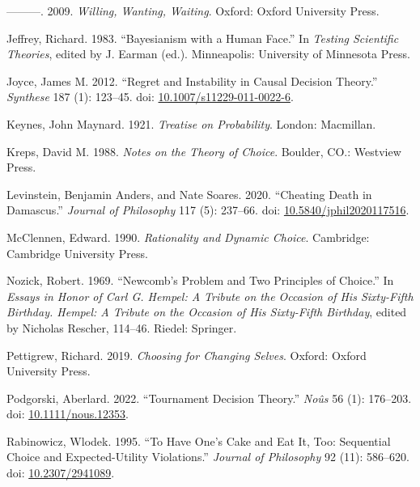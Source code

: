 \documentclass[
  10pt,
  letterpaper,
  DIV=11,
  numbers=noendperiod,
  twoside]{scrartcl}
\newlength{\cslhangindent}
\newenvironment{CSLReferences}[2] %
 {\begin{list}{}{%
  \setlength{\itemindent}{0pt}
  \setlength{\leftmargin}{0pt}
  \setlength{\parsep}{0pt}
  \ifodd #1
   \setlength{\leftmargin}{\cslhangindent}
   \setlength{\itemindent}{-1\cslhangindent}
  \fi
  \setlength{\itemsep}{#2\baselineskip}}}
 {\end{list}}
\begin{document}
\begin{CSLReferences}{1}{0}
---------. 2009. \emph{Willing, Wanting, Waiting}. Oxford: Oxford
University Press.

Jeffrey, Richard. 1983. {``Bayesianism with a Human Face.''} In
\emph{Testing Scientific Theories}, edited by J. Earman (ed.).
Minneapolis: University of Minnesota Press.

Joyce, James M. 2012. {``Regret and Instability in Causal Decision
Theory.''} \emph{Synthese} 187 (1): 123--45. doi:
\href{https://doi.org/10.1007/s11229-011-0022-6}{10.1007/s11229-011-0022-6}.

Keynes, John Maynard. 1921. \emph{Treatise on Probability}. London:
Macmillan.

Kreps, David M. 1988. \emph{Notes on the Theory of Choice}. Boulder,
CO.: Westview Press.

Levinstein, Benjamin Anders, and Nate Soares. 2020. {``Cheating Death in
Damascus.''} \emph{Journal of Philosophy} 117 (5): 237--66. doi:
\href{https://doi.org/10.5840/jphil2020117516}{10.5840/jphil2020117516}.

McClennen, Edward. 1990. \emph{Rationality and Dynamic Choice}.
Cambridge: {C}ambridge {U}niversity {P}ress.

Nozick, Robert. 1969. {``Newcomb's Problem and Two Principles of
Choice.''} In \emph{Essays in Honor of Carl {G}. Hempel: A Tribute on
the Occasion of His Sixty-Fifth Birthday. Hempel: A Tribute on the
Occasion of His Sixty-Fifth Birthday}, edited by Nicholas Rescher,
114--46. Riedel: Springer.

Pettigrew, Richard. 2019. \emph{Choosing for Changing Selves}. Oxford:
{O}xford {U}niversity {P}ress.

Podgorski, Aberlard. 2022. {``Tournament Decision Theory.''}
\emph{No{û}s} 56 (1): 176--203. doi:
\href{https://doi.org/10.1111/nous.12353}{10.1111/nous.12353}.

Rabinowicz, Wlodek. 1995. {``To Have One's Cake and Eat It, Too:
Sequential Choice and Expected-Utility Violations.''} \emph{Journal of
Philosophy} 92 (11): 586--620. doi:
\href{https://doi.org/10.2307/2941089}{10.2307/2941089}.


\end{CSLReferences}
\end{document}
